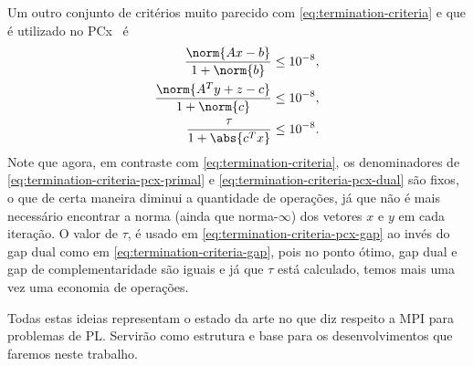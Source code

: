 Um outro conjunto de critérios muito parecido  com
\eqref{eq:termination-criteria}  e que é utilizado no PCx~\cite{Czyzyk:1999hk} é
\begin{subequations}
\label{eq:termination-criteria-pcx}
\begin{align}
	\dfrac{\norm{Ax - b}}{1 + \norm{b}} \leq 10^{-8},
	\label{eq:termination-criteria-pcx-primal}\\
	\dfrac{\norm{A^Ty + z - c}}{1 + \norm{c}} \leq 10^{-8},
	\label{eq:termination-criteria-pcx-dual}\\
	\dfrac{\tau}{1 + \abs{c^Tx}}\leq
	10^{-8}.\label{eq:termination-criteria-pcx-gap}
\end{align}
\end{subequations}
Note que agora, em contraste com
\eqref{eq:termination-criteria}, os denominadores de 
\eqref{eq:termination-criteria-pcx-primal} e
\eqref{eq:termination-criteria-pcx-dual} são fixos, o que de certa maneira
diminui a quantidade de operações, já que não é mais necessário encontrar a
norma (ainda que norma-$\infty$) dos vetores $x$ e $y$ em cada
iteração. O valor de $\tau$,  é usado em \eqref{eq:termination-criteria-pcx-gap} ao
 invés do gap dual  como em \eqref{eq:termination-criteria-gap}, pois no ponto
 ótimo, gap dual e gap de complementaridade são iguais e já que $\tau$ está
calculado, temos mais uma vez uma economia de operações. 




Todas estas ideias representam o estado da arte no que diz respeito a \ac{MPI}
para problemas de \ac{PL}. Servirão como estrutura e base para os
desenvolvimentos que faremos neste trabalho.
